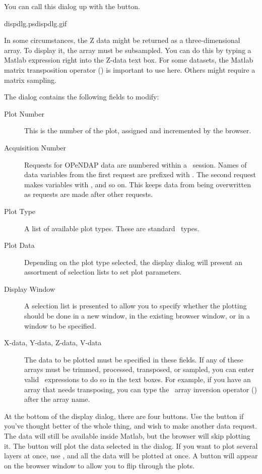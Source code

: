 You can call this dialog up with the 
button. 

%
{dispdlg.ps}{dispdlg.gif}

In some circumstances, the Z data might be returned as a
three-dimensional array.  To display it, the array must be subsampled.
You can do this by typing a Matlab expression right into the Z-data
text box.  For some datasets, the Matlab matrix transposition operator
() is important to use here.  Others might require a matrix
sampling. 

The dialog contains the following fields to modify:

\begin{description}
\item[Plot Number] This is the number of the plot, assigned and
  incremented by the browser.
\item[Acquisition Number] Requests for OPeNDAP data are numbered within a
  \matlab\ session.  Names of data variables from the first request
  are prefixed with .  The second request makes variables
  with , and so on.  This keeps data from being overwritten
  as requests are made after other requests.
\item[Plot Type] A list of available plot types.  These are standard
  \matlab\ types.
\item[Plot Data] Depending on the plot type selected, the display
  dialog will present an assortment of selection lists to set plot
  parameters. 
\item[Display Window] A selection list is presented to allow you to
  specify whether the plotting should be done in a new window, in the
  existing browser window, or in a window to be specified.
\item[X-data, Y-data, Z-data, V-data] The data to be plotted must be
  specified in these fields.  If any of these arrays must be trimmed,
  processed, transposed, or sampled, you can enter valid \matlab\ 
  expressions to do so in the text boxes.  For example, if you have an
  array that needs transposing, you can type the \matlab\ array
  inversion operator () after the array name.
\end{description}



At the bottom of the display dialog, there are four buttons.  Use the
\but{Cancel} button if you've thought better of the whole thing, and
wish to make another data request.  The data will still be available
inside Matlab, but the browser will skip plotting it.  The \but{Plot
  Selected} button will plot the data selected in the dialog.  If you
want to plot several layers at once, use \but{Plot All}, and all the
data will be plotted at once.  A \but{Next Plot} button will appear on
the browser window to allow you to flip through the plots.

